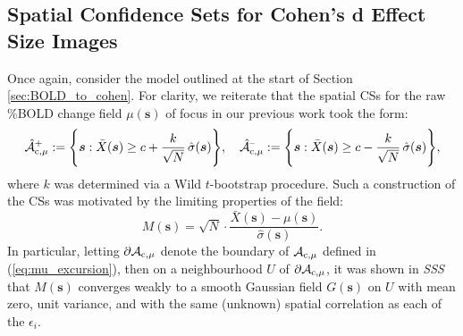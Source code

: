 \subsection{Spatial Confidence Sets for Cohen's d Effect Size Images}
\label{sec:confidence_sets_for_cohens_d}
Once again, consider the model outlined at the start of Section {\ref{sec:BOLD_to_cohen}}. For clarity, we reiterate that the spatial CSs for the raw \%BOLD change field $\mu(\bm{s})$ of focus in our previous work took the form:
\begin{equation}
\label{eq:mu_CSs_again}
\operatorname{\hat{\mathcal{A}}_{c,\mu}^+} := \Bigg\{\bm{s} : \bar{X}(\bm{s}) \geq c + \frac{k}{\sqrt{N}}\, \hat{\sigma}(\bm{s}) \Bigg\}, \quad \operatorname{\hat{\mathcal{A}}_{c,\mu}^{\textrm{--}}} := \Bigg\{\bm{s} : \bar{X}(\bm{s}) \geq c - \frac{k}{\sqrt{N}} \,\hat{\sigma}(\bm{s})  \Bigg\},
\end{equation}
where $k$ was determined via a Wild $t$-bootstrap procedure. Such a construction of the CSs was motivated by the limiting properties of the field:
\begin{equation}
\label{eq:percent_BOLD_normalised error_field}
M(\bm{s}) = \sqrt{N} \cdot \frac{\bar{X}(\bm{s}) - \mu(\bm{s})}{\hat{\sigma}(\bm{s})}.
\end{equation}
In particular, letting $\operatorname{\partial\mathcal{A}_{c,\mu}}$ denote the boundary of $\operatorname{\mathcal{A}_{c,\mu}}$ defined in (\ref{eq:mu_excursion}), then on a neighbourhood $U$ of $\operatorname{\partial\mathcal{A}_{c,\mu}}$, it was shown in \textit{SSS} that $M(\bm{s})$ converges weakly to a smooth Gaussian field $G(\bm{s})$ on $U$ with mean zero, unit variance, and with the same (unknown) spatial correlation as each of the $\epsilon_{i}$. 

